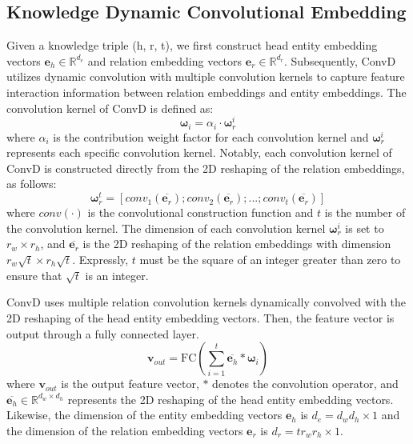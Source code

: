 \documentclass[letterpaper]{article} %
\begin{document}
\subsection{Knowledge Dynamic Convolutional Embedding}
Given a knowledge triple (h, r, t), we first construct head entity embedding vectors $\boldsymbol{e}_{h} \in \mathbb{R}^{d_{e}}$ and relation embedding vectors $\boldsymbol{e}_{r} \in \mathbb{R}^{d_{r}}$. Subsequently, ConvD utilizes dynamic convolution with multiple convolution kernels to capture feature interaction information between relation embeddings and entity embeddings. The convolution kernel of ConvD is defined as: 
\begin{equation}
    \boldsymbol{\omega}_{i} = \alpha_{i} \cdot \boldsymbol{\omega}_{r}^{i}
\end{equation}
where $\alpha_{i}$ is the contribution weight factor for each convolution kernel and $\boldsymbol{\omega}_{r}^{i}$ represents each specific convolution kernel. Notably, each convolution kernel of ConvD is constructed directly from the 2D reshaping of the relation embeddings, as follows:
\begin{equation}
    \boldsymbol{\omega}_{r}^{t} = [conv_{1}(\overline{\boldsymbol{e}_{r}}); conv_{2}(\overline{\boldsymbol{e}_{r}}); ...; conv_{t}(\overline{\boldsymbol{e}_{r}})]
\end{equation}
where $conv(\cdot)$ is the convolutional construction function and $t$ is the number of the convolution kernel. The dimension of each convolution kernel $\boldsymbol{\omega}_{r}^{i}$ is set to $r_{w} \times r_{h}$, and $\overline{\boldsymbol{e}_{r}}$ is the 2D reshaping of the relation embeddings with dimension $r_{w}\sqrt{t} \times r_{h}\sqrt{t}$. Expressly, $t$ must be the square of an integer greater than zero to ensure that $\sqrt{t}$ is an integer.

ConvD uses multiple relation convolution kernels dynamically convolved with the 2D reshaping of the head entity embedding vectors. Then, the feature vector is output through a fully connected layer.
\begin{equation}
    \boldsymbol{v}_{out} = \mathrm{FC} \left (\sum_{i=1}^{t} \overline{\boldsymbol{e}_{h}} * \boldsymbol{\omega}_{i}  \right ) 
\end{equation}
where $\boldsymbol{v}_{out}$ is the output feature vector, $*$ denotes the convolution operator, and $\overline{\boldsymbol{e}_{h}} \in \mathbb{R}^{d_{w} \times d_{h}}$ represents the 2D reshaping of the head entity embedding vectors. Likewise, the dimension of the entity embedding vectors $\boldsymbol{e}_{h}$ is $d_{e}=d_{w}d_{h} \times 1$ and the dimension of the relation embedding vectors $\boldsymbol{e}_{r}$ is $d_{r}=tr_{w}r_{h} \times 1$.
\end{document}
